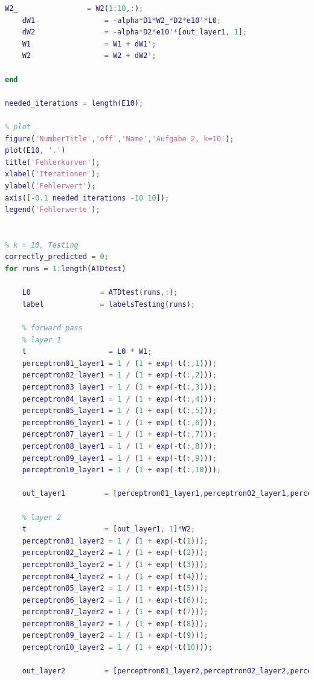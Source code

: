 \documentclass[12pt]{article}
\begin{document}
\begin{lstlisting}[language=Matlab]
    W2_                = W2(1:10,:);
    dW1                = -alpha*D1*W2_*D2*e10'*L0;
    dW2                = -alpha*D2*e10'*[out_layer1, 1];
    W1                 = W1 + dW1';
    W2                 = W2 + dW2';

end

needed_iterations = length(E10);

% plot
figure('NumberTitle','off','Name','Aufgabe 2, k=10');
plot(E10, '.')
title('Fehlerkurven');
xlabel('Iterationen');
ylabel('Fehlerwert');
axis([-0.1 needed_iterations -10 10]);
legend('Fehlerwerte');


% k = 10, Testing
correctly_predicted = 0;
for runs = 1:length(ATDtest)
    
    L0                = ATDtest(runs,:);
    label             = labelsTesting(runs);
        
    % forward pass
    % layer 1
    t                   = L0 * W1;
    perceptron01_layer1 = 1 / (1 + exp(-t(:,1)));
    perceptron02_layer1 = 1 / (1 + exp(-t(:,2)));
    perceptron03_layer1 = 1 / (1 + exp(-t(:,3)));
    perceptron04_layer1 = 1 / (1 + exp(-t(:,4)));
    perceptron05_layer1 = 1 / (1 + exp(-t(:,5)));
    perceptron06_layer1 = 1 / (1 + exp(-t(:,6)));
    perceptron07_layer1 = 1 / (1 + exp(-t(:,7)));
    perceptron08_layer1 = 1 / (1 + exp(-t(:,8)));
    perceptron09_layer1 = 1 / (1 + exp(-t(:,9)));
    perceptron10_layer1 = 1 / (1 + exp(-t(:,10)));
    
    out_layer1         = [perceptron01_layer1,perceptron02_layer1,perceptron03_layer1,perceptron04_layer1,perceptron05_layer1,perceptron06_layer1,perceptron07_layer1,perceptron08_layer1,perceptron09_layer1,perceptron10_layer1];
    
    % layer 2
    t                  = [out_layer1, 1]*W2;
    perceptron01_layer2 = 1 / (1 + exp(-t(1)));
    perceptron02_layer2 = 1 / (1 + exp(-t(2)));
    perceptron03_layer2 = 1 / (1 + exp(-t(3)));
    perceptron04_layer2 = 1 / (1 + exp(-t(4)));
    perceptron05_layer2 = 1 / (1 + exp(-t(5)));
    perceptron06_layer2 = 1 / (1 + exp(-t(6)));
    perceptron07_layer2 = 1 / (1 + exp(-t(7)));
    perceptron08_layer2 = 1 / (1 + exp(-t(8)));
    perceptron09_layer2 = 1 / (1 + exp(-t(9)));
    perceptron10_layer2 = 1 / (1 + exp(-t(10)));
    
    out_layer2         = [perceptron01_layer2,perceptron02_layer2,perceptron03_layer2,perceptron04_layer2,perceptron05_layer2, perceptron06_layer2,perceptron07_layer2,perceptron08_layer2,perceptron09_layer2,perceptron10_layer2];
    

\end{lstlisting}
\end{document}
